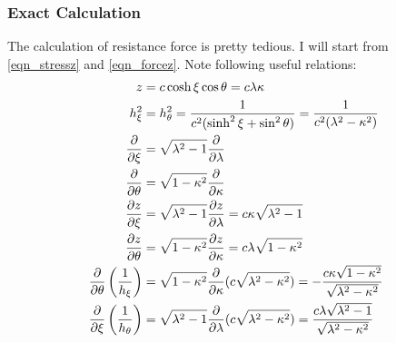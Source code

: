\documentclass[fontsize=11pt, %
                             paper=a4, %
                             twoside, %
                             captions=tableheading,
                             index=totoc,
                             hyperref]{labbook}
\begin{document}
\subsubsection{Exact Calculation}
The calculation of resistance force is pretty tedious. I will start from \ref{eqn_stressz} and \ref{eqn_forcez}. Note following useful relations:
\begin{equation}
\begin{aligned}
z&=c\cosh\xi\cos\theta=c\lambda\kappa\\
h_\xi^2&=h_\theta^2=\frac{1}{c^2(\sinh^2\xi+\sin^2\theta)}=\frac{1}{c^2(\lambda^2-\kappa^2)}\\
\frac{\partial }{\partial \xi}&=\sqrt{\lambda^2-1}\frac{\partial }{\partial \lambda}\\
\frac{\partial }{\partial \theta}&=\sqrt{1-\kappa^2}\frac{\partial }{\partial \kappa}\\
\frac{\partial z}{\partial \xi}&=\sqrt{\lambda^2-1}\frac{\partial z}{\partial \lambda}=c\kappa\sqrt{\lambda^2-1}\\
\frac{\partial z}{\partial \theta}&=\sqrt{1-\kappa^2}\frac{\partial z}{\partial \kappa}=c\lambda\sqrt{1-\kappa^2}\\
\frac{\partial }{\partial \theta}\left(\frac{1}{h_\xi}\right)&=\sqrt{1-\kappa^2}\frac{\partial }{\partial \kappa}(c\sqrt{\lambda^2-\kappa^2})=-\frac{c\kappa\sqrt{1-\kappa^2}}{\sqrt{\lambda^2-\kappa^2}}\\
\frac{\partial }{\partial \xi}\left(\frac{1}{h_\theta}\right)&=\sqrt{\lambda^2-1}\frac{\partial }{\partial \lambda}(c\sqrt{\lambda^2-\kappa^2})=\frac{c\lambda\sqrt{\lambda^2-1}}{\sqrt{\lambda^2-\kappa^2}}\\
\end{aligned}
\end{equation}
\end{document}
